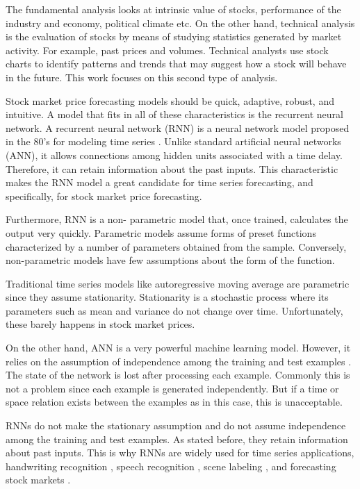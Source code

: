 The fundamental analysis looks at intrinsic value of stocks, performance of the industry and economy, political climate etc. On the other hand, technical analysis is the evaluation of stocks by means of studying statistics generated by market activity. For example, past prices and volumes. Technical analysts use stock charts to identify patterns and trends that may suggest how a stock will behave in the future\cite{patel2015predicting}. This work focuses on this second type of analysis.

Stock market price forecasting models should be quick, adaptive, robust, and intuitive. A model that fits in all of these characteristics is the recurrent neural network. A recurrent neural network (RNN) is a neural network model proposed in the 80's for modeling time series \cite{pascanu2013difficulty}. Unlike standard artificial neural networks (ANN), it allows connections among hidden units associated with a time delay. Therefore, it can retain information about the past inputs. This characteristic makes the RNN model a great candidate for time series forecasting, and specifically, for stock market price forecasting.

Furthermore, RNN is a non- parametric model that, once trained, calculates the output very quickly. Parametric models assume forms of preset functions characterized by a number of parameters obtained from the sample. Conversely, non-parametric models have few assumptions about the form of the function.  

Traditional time series models like autoregressive moving average are parametric since they assume stationarity. Stationarity is a stochastic process where its parameters such as mean and variance do not change over time. Unfortunately, these barely happens in stock market prices. 

On the other hand, ANN is a very powerful machine learning model. However, it relies on the assumption of independence among the training and test examples \cite{lipton2015critical}. The state of the network is lost after processing each example. Commonly this is not a problem since each example is generated independently. But if a time or space relation exists between the examples as in this case, this is unacceptable.

RNNs do not make the stationary assumption and do not assume independence among the training and test examples. As stated before, they retain information about past inputs. This is why RNNs are widely used for time series applications, handwriting recognition \cite{graves2009offline}, speech recognition \cite{graves2013generating}, scene labeling \cite{pinheiro2014recurrent}, and forecasting stock markets \cite{hsieh2011forecasting}. 

